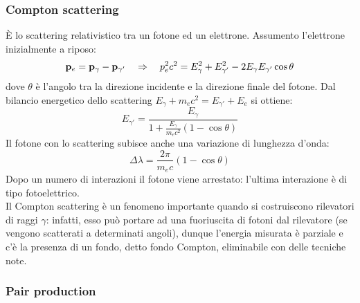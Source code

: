 \subsubsection{Compton scattering}

È lo scattering relativistico tra un fotone ed un elettrone. Assumento l'elettrone inizialmente a riposo:
\begin{equation*}
	\mathbf{p}_e = \mathbf{p}_{\gamma} - \mathbf{p}_{\gamma'} \quad\Rightarrow\quad p_e^2 c^2 = E_{\gamma}^2 + E_{\gamma'}^2 - 2E_{\gamma} E_{\gamma'} \cos \theta
\end{equation*}
dove $ \theta $ è l'angolo tra la direzione incidente e la direzione finale del fotone. Dal bilancio energetico dello scattering $ E_{\gamma} + m_e c^2 = E_{\gamma'} + E_e $ si ottiene:
\begin{equation}
	E_{\gamma'} = \frac{E_{\gamma}}{1 + \frac{E_{\gamma}}{m_e c^2} (1 - \cos \theta)}
	\label{eq:3.11}
\end{equation}
Il fotone con lo scattering subisce anche una variazione di lunghezza d'onda:
\begin{equation}
	\Delta \lambda = \frac{2 \pi}{m_e c} (1 - \cos \theta)
	\label{eq:3.12}
\end{equation}
Dopo un numero di interazioni il fotone viene arrestato: l'ultima interazione è di tipo fotoelettrico.\\
Il Compton scattering è un fenomeno importante quando si costruiscono rilevatori di raggi $ \gamma $: infatti, esso può portare ad una fuoriuscita di fotoni dal rilevatore (se vengono scatterati a determinati angoli), dunque l'energia misurata è parziale e c'è la presenza di un fondo, detto fondo Compton, eliminabile con delle tecniche note.

\subsubsection{Pair production}

